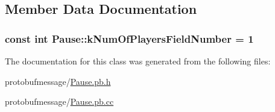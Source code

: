 \subsection{Member Data Documentation}
\hypertarget{class_pause_a3db8e5c058abd2047804f210d5f982ae}{
\subsubsection[{k\-Num\-Of\-Players\-Field\-Number}]{\setlength{\rightskip}{0pt plus 5cm}const int Pause\-::k\-Num\-Of\-Players\-Field\-Number = 1\hspace{0.3cm}{\ttfamily [static]}}}\label{class_pause_a3db8e5c058abd2047804f210d5f982ae}


The documentation for this class was generated from the following files\-:\begin{DoxyCompactItemize}
\item 
protobufmessage/\hyperlink{_pause_8pb_8h}{Pause.\-pb.\-h}\item 
protobufmessage/\hyperlink{_pause_8pb_8cc}{Pause.\-pb.\-cc}\end{DoxyCompactItemize}
